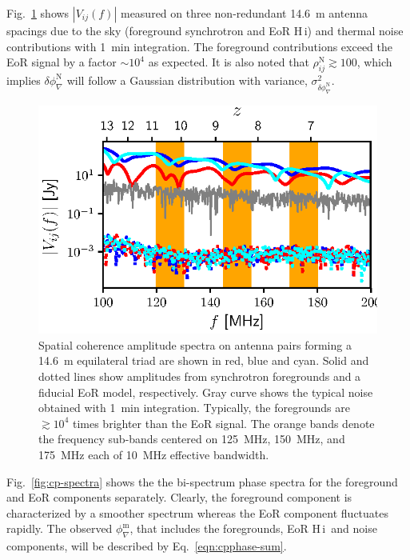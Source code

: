 \documentclass[
reprint,
superscriptaddress,
amsmath,
amssymb,
aps,
prd
]{revtex4-1}
\newcommand{\HI}{H\,{\sc i}}
\begin{document}
Fig.~\ref{fig:vis-spectra} shows $|V_{ij}(f)|$ measured on three non-redundant 14.6~m antenna spacings due to the sky (foreground synchrotron and EoR \HI) and thermal noise contributions with 1~min integration. The foreground contributions exceed the EoR signal by a factor $\sim 10^4$ as expected. It is also noted that $\rho_{ij}^\textrm{N} \gtrsim 100$, which implies $\delta\phi_\nabla^\textrm{N}$ will follow a Gaussian distribution with variance, $\sigma_{\delta\phi_\nabla^\textrm{N}}^2$.

\begin{figure}[htb]
\includegraphics[width=\linewidth]{visamp_spectra_asm_eor_noise}
\caption{Spatial coherence amplitude spectra on antenna pairs forming a 14.6~m equilateral triad are shown in red, blue and cyan. Solid and dotted lines show amplitudes from synchrotron foregrounds and a fiducial EoR model, respectively. Gray curve shows the typical noise obtained with 1~min integration. Typically, the foregrounds are $\gtrsim 10^4$ times brighter than the EoR signal. The orange bands denote the frequency sub-bands centered on 125~MHz, 150~MHz, and 175~MHz each of 10~MHz effective bandwidth. \label{fig:vis-spectra}}
\end{figure}

Fig.~\ref{fig:cp-spectra} shows the the bi-spectrum phase spectra for the foreground and EoR components separately. Clearly, the foreground component is characterized by a smoother spectrum whereas the EoR component fluctuates rapidly. The observed $\phi_\nabla^\textrm{m}$, that includes the foregrounds, EoR \HI\, and noise components, will be described by Eq.~\ref{eqn:cpphase-sum}. 
\end{document}
